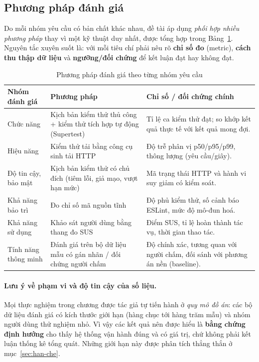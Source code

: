 \subsection{Phương pháp đánh giá}
\label{subsec:phuong-phap}

Do mỗi nhóm yêu cầu có bản chất khác nhau, đề tài áp dụng \textit{phối hợp
nhiều phương pháp} thay vì một kỹ thuật duy nhất, được tổng hợp trong
Bảng~\ref{tab:eval-method}. Nguyên tắc xuyên suốt là: với mỗi tiêu chí phải
nêu rõ \textbf{chỉ số đo} (metric), \textbf{cách thu thập dữ liệu} và
\textbf{ngưỡng/đối chứng} để kết luận đạt hay không đạt.

\begin{table}[h]
  \centering
  \small
  \renewcommand{\arraystretch}{1.3}
  \begin{tabular}{|p{3.2cm}|p{4.6cm}|p{6.2cm}|}
    \hline
    \textbf{Nhóm đánh giá} & \textbf{Phương pháp} & \textbf{Chỉ số / đối chứng chính} \\
    \hline
    Chức năng & Kịch bản kiểm thử thủ công + kiểm thử tích hợp tự động (Supertest) & Tỉ lệ ca kiểm thử đạt; so khớp kết quả thực tế với kết quả mong đợi. \\
    \hline
    Hiệu năng & Kiểm thử tải bằng công cụ sinh tải HTTP~\cite{k6load} & Độ trễ phân vị p50/p95/p99, thông lượng (yêu cầu/giây). \\
    \hline
    Độ tin cậy, bảo mật & Kịch bản kiểm thử có chủ đích (tiêm lỗi, giả mạo, vượt hạn mức) & Mã trạng thái HTTP và hành vi suy giảm có kiểm soát. \\
    \hline
    Khả năng bảo trì & Đo chỉ số mã nguồn tĩnh & Độ phủ kiểm thử, số cảnh báo ESLint, mức độ mô-đun hoá. \\
    \hline
    Khả năng sử dụng & Khảo sát người dùng bằng thang đo SUS~\cite{brooke1996sus} & Điểm SUS, tỉ lệ hoàn thành tác vụ, thời gian thao tác. \\
    \hline
    Tính năng thông minh & Đánh giá trên bộ dữ liệu mẫu có gán nhãn / đối chứng người chấm & Độ chính xác, tương quan với người chấm, đối sánh với phương án nền (baseline). \\
    \hline
  \end{tabular}
  \caption{Phương pháp đánh giá theo từng nhóm yêu cầu}
  \label{tab:eval-method}
\end{table}

\paragraph{Lưu ý về phạm vi và độ tin cậy của số liệu.} Mọi thực nghiệm trong
chương được tác giả tự tiến hành ở \textit{quy mô đồ án}: các bộ dữ liệu đánh
giá có kích thước giới hạn (hàng chục tới hàng trăm mẫu) và nhóm người dùng
thử nghiệm nhỏ. Vì vậy các kết quả nên được hiểu là \textbf{bằng chứng định
hướng} cho thấy hệ thống vận hành đúng và có giá trị, chứ không phải kết luận
thống kê tổng quát. Những giới hạn này được phân tích thẳng thắn ở
mục~\ref{sec:han-che}.

